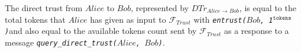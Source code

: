 \begin{definition}
  The direct trust from $Alice$ to $Bob$, represented by $DTr_{Alice \rightarrow Bob}$, is
  equal to the total tokens that $Alice$ has given as input to $\mathcal{F}_{Trust}$ with
  \emph{\texttt{entrust(}$Bob$\texttt{, 1}$^{\texttt{tokens}}$\texttt{)}}and also equal to
  the available tokens count sent by $\mathcal{F}_{Trust}$ as a response to a message
  \emph{\texttt{query\_direct\_trust(}$Alice$\texttt{, }$Bob$\texttt{)}}.
\end{definition}

